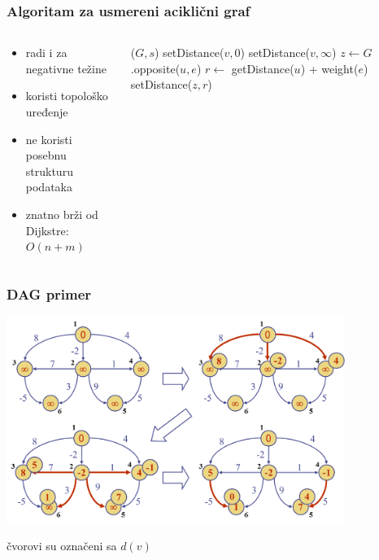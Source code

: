 \documentclass[compress]{beamer}
\begin{document}
\begin{frame}[fragile,shrink=2]
  \frametitle{Algoritam za usmereni aciklični graf}
  \begin{columns}
    \begin{column}[t]{5cm}
      \begin{itemize}
        \item radi i za negativne težine
        \item koristi topološko uređenje
        \item ne koristi posebnu strukturu podataka
        \item znatno brži od Dijkstre: $O(n+m)$
      \end{itemize}
    \end{column}
    \begin{column}[t]{7cm}
      \begin{algorithmic}
        \STATE {}($G,s$)
            \STATE setDistance($v,0$)
          \ELSE
            \STATE setDistance($v,\infty$)
          \ENDIF
        \ENDFOR
        \STATE {}
          \STATE {}
            \STATE {}
            \STATE $z \leftarrow G$.opposite($u,e$)
            \STATE $r \leftarrow$ getDistance($u$) + weight($e$)
              \STATE setDistance($z,r$)
            \ENDIF
          \ENDFOR
        \ENDFOR
      \end{algorithmic}
    \end{column}
  \end{columns}
\end{frame}

\begin{frame}[fragile]
  \frametitle{DAG primer}
  \begin{center}
    \includegraphics[width=11cm]{asp-14-pic67.png}
  \end{center}
  \hfill {\scriptsize čvorovi su označeni sa $d(v)$}
\end{frame}
\end{document}
